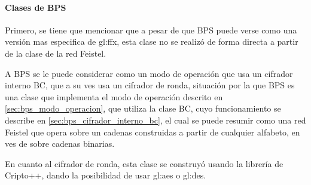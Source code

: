 %
%
%

\paragraph{Clases de BPS}

Primero, se tiene que mencionar que a pesar de que BPS puede verse como una
versión mas especifica de \gls{gl:ffx}, esta clase no se realizó de forma
directa a partir de la clase de la red Feistel. 

A BPS se le puede considerar como un modo de operación que usa un cifrador
interno BC, que a su ves usa un cifrador de ronda, situación por la que BPS
es una clase que implementa el modo de operación descrito en 
\ref{sec:bps_modo_operacion}, que utiliza la clase BC, cuyo funcionamiento se
describe en \ref{sec:bps_cifrador_interno_bc}, el cual se puede resumir como
una red Feistel que opera sobre un cadenas construidas a partir de cualquier
alfabeto, en ves de sobre cadenas binarias.

En cuanto al cifrador de ronda, esta clase se construyó usando la librería de
Cripto++, dando la posibilidad de usar \gls{gl:aes} o \gls{gl:des}.

